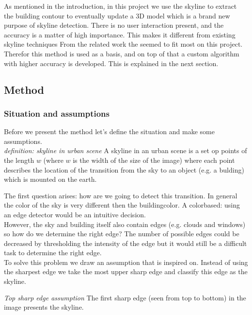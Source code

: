 As mentioned in the introduction, in this project we use the skyline to
extract the building contour to eventually update a 3D model which is a brand
new purpose of skyline detection.  There is no user interaction present, and
the accuracy is a matter of high importance.  This makes it different from
existing skyline techniques 
From the related work the %
seemed to fit most on this project.  Therefor this method is used as a basis, and on top of that a custom
algorithm with higher accuracy is developed. This is explained in the next
section.



\subsection{Method} %
\subsubsection{Situation and assumptions}
Before we present the method let's define the situation and make some
assumptions.\\

\textit{definition: skyline in urban scene}
A skyline in an urban scene is a set op points of the length $w$ (where $w$ is the
width of the size of the image) where each point describes the location of the
transition from the sky to an object (e.g. a bulding) which is mounted on the earth.

The first question arises: how are we going to detect this transition. In
general the color of the sky is very different then the buildingcolor. A
colorbased: using an edge detector would be an intuitive decision.\\
However, the sky and building itself also contain edges (e.g. clouds and 
windows) so how do we determine the right edge?
The number of possible edges could be decreased by thresholding the intensity of
the edge but it would still be a difficult task to determine the right edge.\\

To solve this problem we draw an assumption that is inspired on.
Instead of using the sharpest edge we take the most upper sharp edge and
classify this edge as the skyline.

\textit{Top sharp edge assumption}
The first sharp edge (seen from top to bottom) in the image 
presents the skyline.


